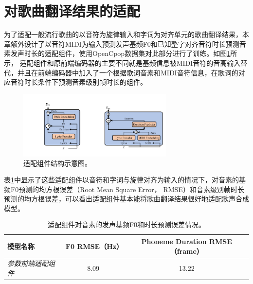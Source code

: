 \section{对歌曲翻译结果的适配}
为了适配一般流行歌曲的以音符为旋律输入和字词为对齐单元的歌曲翻译结果，本章额外设计了以音符MIDI为输入预测发声基频F0和已知整字对齐音符时长预测音素发声时长的适配组件，使用OpenCpop数据集对此部分进行了训练。如图\ref{fig:ada_encoder}所示，
适配组件和原前端编码器的主要不同就是基频信息被MIDI音符的音高输入替代，并且在前端编码器中加入了一个根据歌词音素和MIDI音符信息，在歌词的对应音符时长条件下预测音素级别帧时长的组件。
\begin{figure}[!ht]
  \centering
	\includegraphics[width=0.69\textwidth]{figure/svs/ada_encoder.pdf}
	\caption{适配组件结构示意图。}
\label{fig:ada_encoder}
\end{figure}
表\ref{tab:singing_obj}中显示了这些适配组件以音符和字词与旋律对齐为输入的情况下，对音素的基频F0预测的均方根误差（Root Mean Square Error， RMSE）和音素级别帧时长预测的均方根误差，可以看出适配组件基本能将歌曲翻译结果很好地适配歌声合成模型。
\begin{table}[!ht]
	\centering
	\setlength{\belowcaptionskip}{8pt} %
	\caption{适配组件对音素的发声基频F0和时长预测误差情况。}
	\begin{tabular}{|l|c|c|}
		\hline
		\textbf{模型名称} &  \textbf{F0 RMSE（Hz）}& \textbf{Phoneme Duration RMSE（frame）} \\
		\hline
		\textit{参数前端适配组件} & 8.09 & 13.22 \\
		\hline
	\end{tabular}
	\label{tab:singing_obj}
\end{table}
